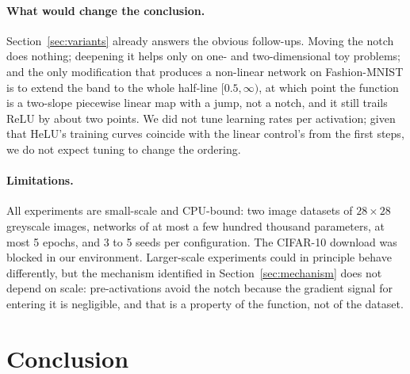 \documentclass[11pt]{article}
\begin{document}
\paragraph{What would change the conclusion.} Section~\ref{sec:variants} already answers the obvious
follow-ups. Moving the notch does nothing; deepening it helps only on one- and two-dimensional toy
problems; and the only modification that produces a non-linear network on Fashion-MNIST is to extend
the band to the whole half-line $[0.5,\infty)$, at which point the function is a two-slope piecewise
linear map with a jump, not a notch, and it still trails ReLU by about two points. We did not tune
learning rates per activation; given that HeLU's training curves coincide with the linear control's
from the first steps, we do not expect tuning to change the ordering.

\paragraph{Limitations.} All experiments are small-scale and CPU-bound: two image datasets of
$28\times28$ greyscale images, networks of at most a few hundred thousand parameters, at most 5 epochs,
and 3 to 5 seeds per configuration. The CIFAR-10 download was blocked in our environment. Larger-scale
experiments could in principle behave differently, but the mechanism identified in
Section~\ref{sec:mechanism} does not depend on scale: pre-activations avoid the notch because the
gradient signal for entering it is negligible, and that is a property of the function, not of the
dataset.

\section{Conclusion}
\end{document}
